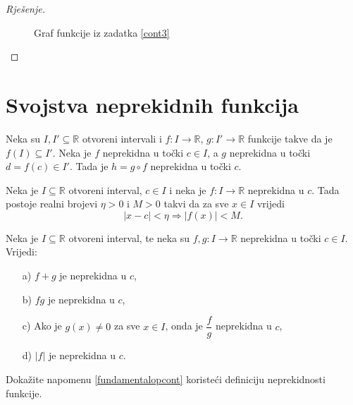 \begin{proof}[Rješenje]
\begin{figure}[ht]
\begin{center}
\end{center}
\caption{Graf funkcije iz zadatka \ref{cont3}}
\end{figure}
\end{proof}
\section{Svojstva neprekidnih funkcija}
\begin{remark}
\label{compcont}
Neka su $I, I'\subseteq \mathbb{R}$ otvoreni intervali i $f : I\to \mathbb{R}$, $g : I'\to \mathbb{R}$ funkcije takve da je $f(I)\subseteq I'$. Neka je $f$ neprekidna u točki $c\in I$, a $g$ neprekidna u točki $d=f(c)\in I'$. Tada je $h=g\circ f$ neprekidna u točki $c$.
\end{remark}
\begin{remark}
\label{localbound}
Neka je $I\subseteq \mathbb{R}$ otvoreni interval, $c\in I$ i neka je $f : I\to \mathbb{R}$ neprekidna u $c$. Tada postoje realni brojevi $\eta>0$ i $M>0$ takvi da za sve $x\in I$ vrijedi
$$|x-c|<\eta\Longrightarrow |f(x)|<M.$$
\end{remark}
\begin{remark}
\label{fundamentalopcont}
Neka je $I\subseteq \mathbb{R}$ otvoreni interval, te neka su $f, g : I\to \mathbb{R}$ neprekidna u točki $c\in I$. Vrijedi:
\begin{itemize}
\item[a)] $f+g$ je neprekidna u $c$,
\item[b)] $fg$ je neprekidna u $c$,
\item[c)] Ako je $g(x)\neq 0$ za sve $x\in I$, onda je $\dfrac{f}{g}$ neprekidna u $c$,
\item[d)] $|f|$ je neprekidna u $c$.
\end{itemize}
\end{remark}
\begin{exercise}
Dokažite napomenu \ref{fundamentalopcont} koristeći definiciju neprekidnosti funkcije.
\end{exercise}
